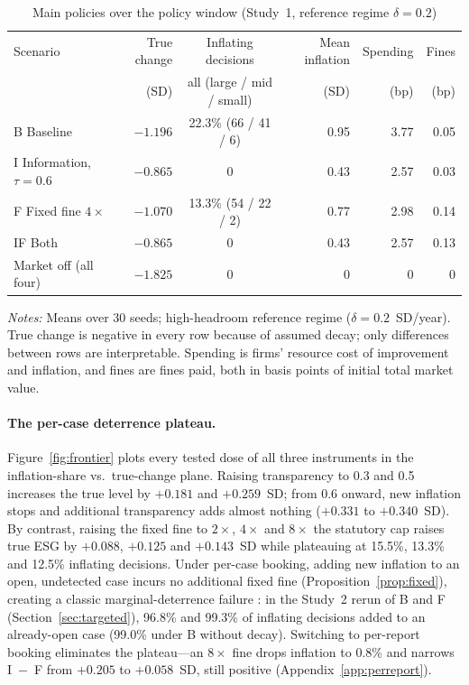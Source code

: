 \documentclass[11pt]{article}
\begin{document}
\begin{table}[t]
\centering
\small
\begin{threeparttable}
\caption{Main policies over the policy window (Study~1, reference regime $\delta = 0.2$)}
\label{tab:policies}
\begin{tabular}{@{}lrcrrr@{}}
\toprule
Scenario & True change & Inflating decisions & Mean inflation & Spending & Fines \\
 & (SD) & all (large / mid / small) & (SD) & (bp) & (bp) \\
\midrule
B Baseline & $-1.196$ & 22.3\% (66 / 41 / 6) & 0.95 & 3.77 & 0.05 \\
I Information, $\tau = 0.6$ & $-0.865$ & 0 & 0.43 & 2.57 & 0.03 \\
F Fixed fine $4\times$ & $-1.070$ & 13.3\% (54 / 22 / 2) & 0.77 & 2.98 & 0.14 \\
IF Both & $-0.865$ & 0 & 0.43 & 2.57 & 0.13 \\
Market off (all four) & $-1.825$ & 0 & 0 & 0 & 0 \\
\bottomrule
\end{tabular}
\begin{tablenotes}[flushleft]\footnotesize
\item \textit{Notes:} Means over 30 seeds; high-headroom reference regime ($\delta = 0.2$~SD/year). True change is negative in every row because of assumed decay; only differences between rows are interpretable. Spending is firms' resource cost of improvement and inflation, and fines are fines paid, both in basis points of initial total market value.
\end{tablenotes}
\end{threeparttable}
\end{table}

\paragraph{The per-case deterrence plateau.}
Figure~\ref{fig:frontier} plots every tested dose of all three instruments in the inflation-share vs.\ true-change plane. Raising transparency to 0.3 and 0.5 increases the true level by $+0.181$ and $+0.259$~SD; from 0.6 onward, new inflation stops and additional transparency adds almost nothing ($+0.331$ to $+0.340$~SD). By contrast, raising the fixed fine to $2\times$, $4\times$ and $8\times$ the statutory cap raises true ESG by $+0.088$, $+0.125$ and $+0.143$~SD while plateauing at 15.5\%, 13.3\% and 12.5\% inflating decisions. Under per-case booking, adding new inflation to an open, undetected case incurs no additional fixed fine (Proposition~\ref{prop:fixed}), creating a classic marginal-deterrence failure \citep{stigler1970optimum,mookherjee1994marginal}: in the Study~2 rerun of B and F (Section~\ref{sec:targeted}), 96.8\% and 99.3\% of inflating decisions added to an already-open case (99.0\% under B without decay). Switching to per-report booking eliminates the plateau---an $8\times$ fine drops inflation to 0.8\% and narrows I~$-$~F from $+0.205$ to $+0.058$~SD, still positive (Appendix~\ref{app:perreport}).
\end{document}
